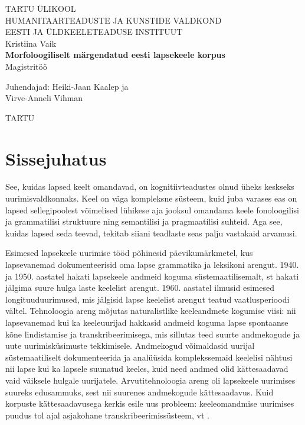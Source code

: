 \documentclass[12pt]{article}
\def\autor{Kristiina Vaik}
\def\pealkiri{Morfoloogiliselt märgendatud eesti lapsekeele korpus}
\begin{document}
\begin{titlepage}
    \begin{center}
        {\large TARTU ÜLIKOOL}\\[0.3cm]
        {\large HUMANITAARTEADUSTE JA KUNSTIDE VALDKOND}\\[0.3cm]
        {\large EESTI JA ÜLDKEELETEADUSE INSTITUUT}\\[0.3cm]

        \vfill
        {\large \autor}\\[0.3cm]
        {\large \textbf{\pealkiri}}\\[0.3cm]
        {\large Magistritöö}

        \vfill
        \begin{center}
        {\large
            Juhendajad: Heiki-Jaan Kaalep ja \\
            Virve-Anneli Vihman
        }
        \end{center}
        \vfill
        {\large TARTU \the\year}
    \end{center}
\end{titlepage}

\tableofcontents

\newpage
\cleardoublepage
{}
{}

\section*{Sissejuhatus}

See, kuidas lapsed keelt omandavad, on kognitiivteadustes olnud üheks keskseks uurimisvaldkonnaks. Keel on väga kompleksne süsteem, kuid juba varases eas on lapsed sellegipoolest võimelised lühikese aja jooksul omandama keele fonoloogilisi ja grammatilisi struktuure ning semantilisi ja pragmaatilisi suhteid. Aga see, kuidas lapsed seda teevad, tekitab siiani teadlaste seas palju vastakaid arvamusi.

Esimesed lapsekeele uurimise tööd põhinesid päevikumärkmetel, kus lapsevanemad dokumenteerisid oma lapse grammatika ja leksikoni arengut. 1940. ja 1950. aastatel hakati lapsekeele andmeid koguma süstemaatilisemalt, st hakati jälgima suure hulga laste keelelist arengut. 1960. aastatel ilmusid esimesed longituuduurimused, mis jälgisid lapse keelelist arengut teatud vaatlusperioodi vältel. Tehnoloogia areng mõjutas naturalistlike keeleandmete kogumise viisi: nii lapsevanemad kui ka keeleuurijad hakkasid andmeid koguma lapse spontaanse kõne lindistamise ja transkribeerimisega, mis sillutas teed suurte andmekogude ja uute uurimisküsimuste tekkimisele. Andmekogud võimaldasid uurijal süstemaatiliselt dokumenteerida ja analüüsida komplekssemaid keelelisi nähtusi nii lapse kui ka lapsele suunatud keeles, kuid need andmed olid kättesaadavad vaid väiksele hulgale uurijatele. Arvutitehnoloogia areng oli lapsekeele uurimises suureks edusammuks, sest nii suurenes andmekogude kättesaadavus. \citep{Behrens} Kuid korpuste kättesaadavusega kerkis esile uus probleem: keeleomandmise uurimises puudus tol ajal asjakohane transkribeerimissüsteem, vt \citep{Ochs}.
\end{document}
